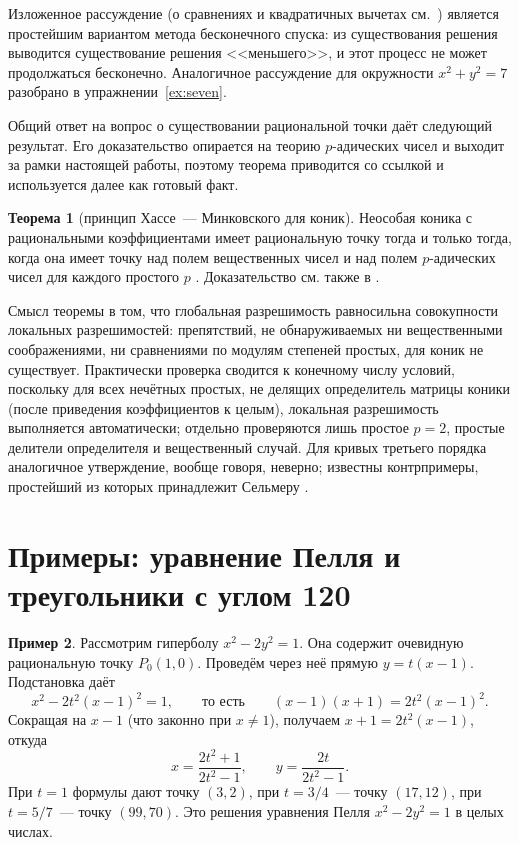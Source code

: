 \documentclass[a4paper,14pt]{extreport}
\theoremstyle{definition}
\newtheorem{thm}{Теорема}[chapter]
\newtheorem{exmp}[thm]{Пример}
\begin{document}
Изложенное рассуждение (о сравнениях и квадратичных вычетах
см.~\cite{vinogradov}) является простейшим вариантом метода бесконечного
спуска: из существования решения выводится существование решения
<<меньшего>>, и этот процесс не может продолжаться бесконечно. Аналогичное
рассуждение для окружности $x^2+y^2=7$ разобрано в упражнении~\ref{ex:seven}.

Общий ответ на вопрос о существовании рациональной точки даёт следующий
результат. Его доказательство опирается на теорию $p$-адических чисел и выходит
за рамки настоящей работы, поэтому теорема приводится со ссылкой и используется
далее как готовый факт.

\begin{thm}[принцип Хассе~--- Минковского для коник]\label{thm:hasse}
Неособая коника с рациональными коэффициентами имеет рациональную точку тогда и
только тогда, когда она имеет точку над полем вещественных чисел и над полем
$p$-адических чисел для каждого простого $p$ \cite[гл.~IV, \S~3]{serre}.
Доказательство см. также в \cite[гл.~1, \S~7]{borevich}.
\end{thm}

Смысл теоремы в том, что глобальная разрешимость равносильна совокупности локальных разрешимостей: препятствий, не
обнаруживаемых ни вещественными соображениями, ни сравнениями по модулям
степеней простых, для коник не существует. Практически проверка сводится к
конечному числу условий, поскольку для всех нечётных простых, не делящих
определитель матрицы коники (после приведения коэффициентов к целым), локальная
разрешимость выполняется автоматически; отдельно проверяются лишь простое
$p=2$, простые делители определителя и вещественный случай. Для кривых третьего порядка
аналогичное утверждение, вообще говоря, неверно; известны контрпримеры,
простейший из которых принадлежит Сельмеру \cite[гл.~IV]{silverman}.

\section{Примеры: уравнение Пелля и треугольники с углом 120\textdegree}

\begin{exmp}
Рассмотрим гиперболу $x^2-2y^2=1$. Она содержит очевидную рациональную точку
$P_0(1,0)$. Проведём через неё прямую $y=t(x-1)$. Подстановка даёт
\[
  x^2-2t^2(x-1)^2=1,\qquad\text{то есть}\qquad (x-1)(x+1)=2t^2(x-1)^2 .
\]
Сокращая на $x-1$ (что законно при $x\neq1$), получаем $x+1=2t^2(x-1)$, откуда
\[
  x=\frac{2t^2+1}{2t^2-1},\qquad y=\frac{2t}{2t^2-1}.
\]
При $t=1$ формулы дают точку $(3,2)$, при $t=3/4$~--- точку $(17,12)$, при
$t=5/7$~--- точку $(99,70)$. Это решения уравнения Пелля
$x^2-2y^2=1$ в целых числах.
\end{exmp}
\end{document}
